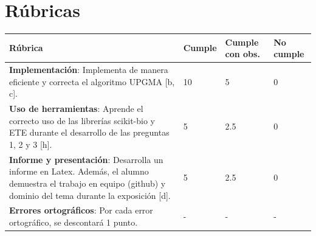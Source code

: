 \documentclass{article}
\begin{document}
\clearpage
\section{Rúbricas}

\begin{table}[hbt!]
	\setlength{\tabcolsep}{0.5em} %
	{\renewcommand{\arraystretch}{1.5}%
		\begin{tabular}{|p{5cm}|x{3cm}|x{3cm}|x{3cm}|}
			\hline 
			\textbf{Rúbrica} & \textbf{Cumple}  & \textbf{Cumple con obs.}  & \textbf{No cumple} \\
			\hline 

			\textbf{Implementación}: Implementa de manera eficiente y correcta el algoritmo UPGMA [b, c].   & 10 & 5 & 0   \\ \hline			
			
			\textbf{Uso de herramientas}: Aprende el correcto uso de las librerías scikit-bio y ETE durante el desarrollo de las preguntas 1, 2 y 3 [h].  & 5 & 2.5 & 0   \\ \hline
			
			\textbf{Informe y presentación}: Desarrolla un informe en Latex. Además, el alumno demuestra el trabajo en equipo (github) y dominio del tema durante la exposición [d]. & 5 & 2.5 & 0   \\ 			\hline 
			
			\textbf{Errores ortográficos}: Por cada error ortográfico, se descontará 1 punto.  & - & - & -   \\ \hline
			
		\end{tabular}
	}
\end{table}

	
\end{document}
